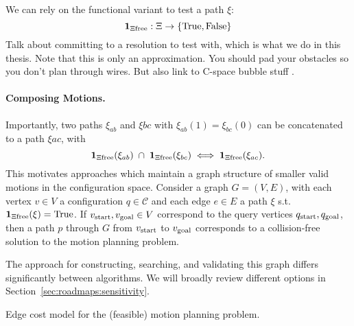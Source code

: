 We can rely on the functional variant to test a path $\xi$:
\begin{equation}
   \mathbf{1}_{\Xi\mbox{\scriptsize free}} : \Xi \rightarrow
      \{ \mbox{True}, \mbox{False} \} 
\end{equation}
Talk about committing to a resolution to test with,
which is what we do in this thesis.
Note that this is only an approximation.
You should pad your obstacles so you don't plan through wires.
But also link to C-space bubble stuff
\citep{quinlan1994modification}.

\paragraph{Composing Motions.}
Importantly,
two paths $\xi_{ab}$ and $\xi{bc}$ with $\xi_{ab}(1) = \xi_{bc}(0)$
can be concatenated to a path $\xi{ac}$,
with
\begin{equation}
   \mathbf{1}_{\Xi\mbox{\scriptsize free}}(\xi_{ab})
   \;\cap\;
   \mathbf{1}_{\Xi\mbox{\scriptsize free}}(\xi_{bc})
   \iff
   \mathbf{1}_{\Xi\mbox{\scriptsize free}}(\xi_{ac}).
\end{equation}
This motivates approaches which maintain a graph structure of
smaller valid motions in the configuration space.
Consider a graph $G = (V,E)$,
with each vertex $v \in V$ a configuration $q \in \mathcal{C}$
and each edge $e \in E$ a path $\xi$
s.t.  $\mathbf{1}_{\Xi\mbox{\scriptsize free}}(\xi) = \mbox{True}$.
If $v_{\mbox{\scriptsize start}}, v_{\mbox{\scriptsize goal}} \in V$
correspond to the query vertices $q_{\mbox{\scriptsize start}}, q_{\mbox{\scriptsize goal}}$,
then a path $p$ through $G$ from
$v_{\mbox{\scriptsize start}}$ to $v_{\mbox{\scriptsize goal}}$
corresponds to a collision-free solution to the motion planning problem.

The approach for constructing, searching, and validating this graph
differs significantly between algorithms.
We will broadly review different options in
Section~\ref{sec:roadmaps:sensitivity}.

\begin{marginfigure}
   \centering
   \caption{Edge cost model
      for the (feasible) motion planning problem.}
\end{marginfigure}

